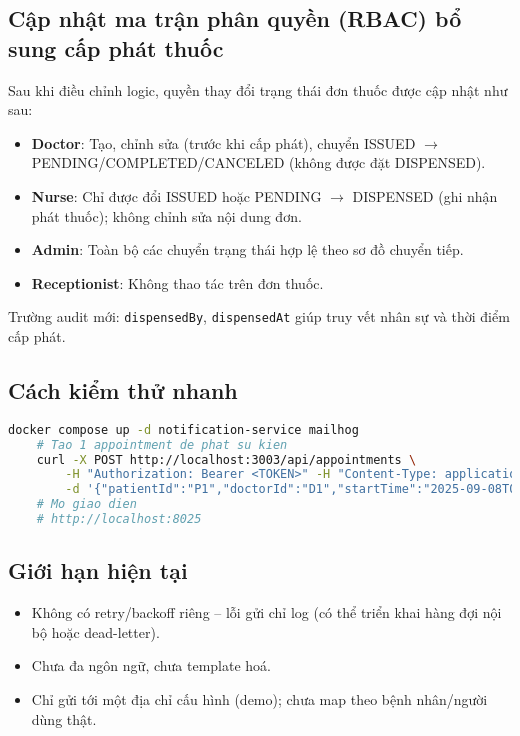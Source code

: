 \documentclass[12pt,a4paper]{report}
\begin{document}
    \subsection*{Cập nhật ma trận phân quyền (RBAC) bổ sung cấp phát thuốc}
    Sau khi điều chỉnh logic, quyền thay đổi trạng thái đơn thuốc được cập nhật như sau:
    \begin{itemize}
        \item \textbf{Doctor}: Tạo, chỉnh sửa (trước khi cấp phát), chuyển ISSUED \ensuremath{\rightarrow} PENDING/COMPLETED/CANCELED (không được đặt DISPENSED).
        \item \textbf{Nurse}: Chỉ được đổi ISSUED hoặc PENDING \ensuremath{\rightarrow} DISPENSED (ghi nhận phát thuốc); không chỉnh sửa nội dung đơn.
        \item \textbf{Admin}: Toàn bộ các chuyển trạng thái hợp lệ theo sơ đồ chuyển tiếp.
        \item \textbf{Receptionist}: Không thao tác trên đơn thuốc.
    \end{itemize}
    Trường audit mới: \texttt{dispensedBy}, \texttt{dispensedAt} giúp truy vết nhân sự và thời điểm cấp phát.

    \subsection*{Cách kiểm thử nhanh}
    \begin{lstlisting}[language=bash]
    docker compose up -d notification-service mailhog
    # Tao 1 appointment de phat su kien
    curl -X POST http://localhost:3003/api/appointments \
        -H "Authorization: Bearer <TOKEN>" -H "Content-Type: application/json" \
        -d '{"patientId":"P1","doctorId":"D1","startTime":"2025-09-08T09:00:00Z","endTime":"2025-09-08T09:30:00Z"}'
    # Mo giao dien
    # http://localhost:8025
    \end{lstlisting}

    \subsection*{Giới hạn hiện tại}
    \begin{itemize}
        \item Không có retry/backoff riêng – lỗi gửi chỉ log (có thể triển khai hàng đợi nội bộ hoặc dead-letter).
        \item Chưa đa ngôn ngữ, chưa template hoá.
        \item Chỉ gửi tới một địa chỉ cấu hình (demo); chưa map theo bệnh nhân/người dùng thật.
    \end{itemize}
\end{document}
